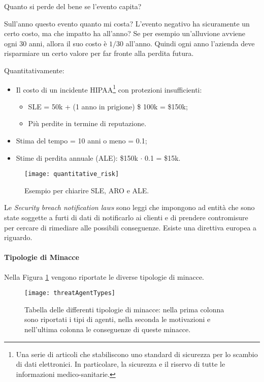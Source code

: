 Quanto si perde del bene se l'evento capita?

Sull'anno questo evento quanto mi costa? L'evento negativo ha sicuramente un
certo costo, ma che impatto ha all'anno? Se per esempio un'alluvione avviene
ogni 30 anni, allora il suo costo è $1/30$ all'anno. Quindi ogni anno l'azienda
deve risparmiare un certo valore per far fronte alla perdita futura.


Quantitativamente:
\begin{itemize}
\item Il costo di un incidente HIPAA\footnote{Una serie di articoli
che stabiliscono uno standard di sicurezza
per lo scambio di dati elettronici. In particolare, la sicurezza e il
riservo di tutte le informazioni medico-sanitarie.}
con protezioni insufficienti:
\begin{itemize}
 \item SLE = 50k + (1 anno in prigione) \$ 100k = \$150k;
 \item Più perdite in termine di reputazione.
\end{itemize}
\item Stima del tempo = 10 anni o meno = 0.1;
\item Stime di perdita annuale (ALE): \$150k $\cdot$ 0.1 = \$15k.
\end{itemize}


\begin{figure}[H]
 \centering
 \texttt{[image: quantitative\_risk]}
 \caption{Esempio per chiarire SLE, ARO e ALE.}
\end{figure}

Le \textit{Security breach notification laws} sono leggi che impongono ad
entità che sono state soggette a furti di dati di notificarlo ai clienti e di
prendere contromisure per cercare di rimediare alle possibili conseguenze.
Esiste una direttiva europea a riguardo.


\paragraph*{Tipologie di Minacce}
Nella Figura \ref{fig:threat:types} vengono riportate le diverse
tipologie di minacce.
\begin{figure}[H]
 \centering
 \texttt{[image: threatAgentTypes]}
 \caption[Tabella delle differenti tipologie di minacce]{Tabella delle
 differenti tipologie di minacce: nella prima colonna sono riportati
 i tipi di agenti, nella seconda le motivazioni e nell'ultima colonna
 le conseguenze di queste minacce.}
 \label{fig:threat:types}
\end{figure}


